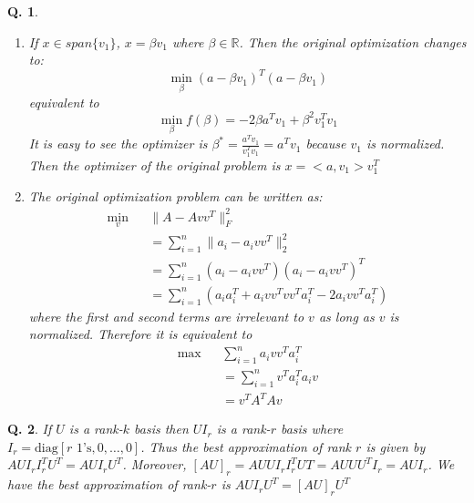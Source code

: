 \documentclass[letterpaper, 11pt]{article}
\newenvironment{problem}{\begin{prob}
                         \rm}{\end{prob}}
\newtheorem{prob}{Q.}
\begin{document}
\begin{problem}
\begin{enumerate}
\item If $x\in span\{v_1\}$, $x = \beta v_1$ where $\beta \in \mathbb{R}$. Then the original optimization changes to:
$$
\min_\beta (a-\beta v_1)^T(a-\beta v_1)
$$
equivalent to
$$
\min_\beta f(\beta) =  -2\beta a^Tv_1 + \beta^2 v_1^Tv_1
$$
It is easy to see the optimizer is $\beta^* = \frac{a^Tv_1}{v_1^Tv_1} = a^Tv_1$ because $v_1$ is normalized. Then the optimizer of the original problem is $x = <a,v_1>v_1^T$

\item The original optimization problem can be written as:
\begin{eqnarray*}
\min_v && \|A-Avv^T\|^2_F \\
&& = \sum_{i=1}^n\|a_i - a_ivv^T\|^2_2 \\
&& = \sum_{i=1}^n(a_i - a_ivv^T)(a_i-a_ivv^T)^T \\
&& = \sum_{i=1}^n(a_ia_i^T + a_ivv^Tvv^Ta_i^T - 2a_ivv^Ta_i^T)
\end{eqnarray*}
where the first and second terms are irrelevant to $v$ as long as $v$ is normalized. Therefore it is equivalent to 
\begin{eqnarray*}
\max && \sum_{i = 1}^n a_ivv^Ta_i^T \\
&& = \sum_{i = 1}^n v^Ta_i^Ta_iv \\
&& = v^TA^TAv
\end{eqnarray*}
\end{enumerate}
\end{problem}
\begin{problem}
If $U$ is a rank-$k$ basis then $UI_r$ is a rank-$r$ basis where $I_r = \textrm{diag}[\textrm{$r$ 1's}, 0,\dots,0]$. Thus the best approximation of rank $r$ is given by $AUI_rI_r^TU^T = AUI_rU^T$. Moreover, $[AU]_r = AUUI_rI_r^TUT = AUUU^TI_r = AUI_r$. We have the best approximation of rank-$r$ is $AUI_rU^T = [AU]_rU^T$
\end{problem}
\end{document}
